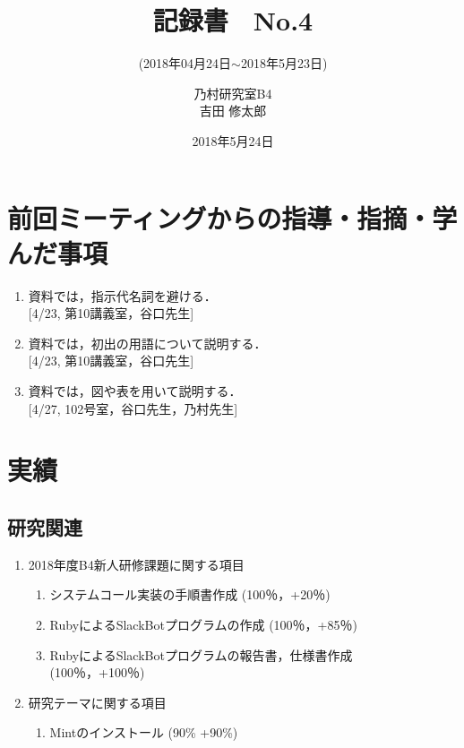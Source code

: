 \documentclass[fleqn, 14pt]{extarticle}
\subtitle{(2018年04月24日$\sim$2018年5月23日)}
\author{乃村研究室B4\\吉田 修太郎}
\date{2018年5月24日}
\title{記録書　No.4}
\begin{document}
\maketitle
\section{前回ミーティングからの指導・指摘・学んだ事項}
\label{sec1}
\begin{enumerate}
\item 資料では，指示代名詞を避ける．\\
  \hfill[4/23, 第10講義室，谷口先生]
\item 資料では，初出の用語について説明する．\\
  \hfill[4/23, 第10講義室，谷口先生]
\item 資料では，図や表を用いて説明する．\\
  \hfill[4/27, 102号室，谷口先生，乃村先生]
\end{enumerate}

\section{実績}
\label{sec2}
\subsection{研究関連}
\label{sec2-1}
\begin{enumerate}
\item 2018年度B4新人研修課題に関する項目
  \hfill
  \label{sec2-1-1}
  \begin{enumerate}
  \item システムコール実装の手順書作成
    \hfill
    \label{sec2-1-1-enum1}
    (100％，+20％)
  \item RubyによるSlackBotプログラムの作成
    \hfill
    \label{sec2-1-1-enum2}
    (100％，+85％)
  \item RubyによるSlackBotプログラムの報告書，仕様書作成 \\
    \hfill
    \label{sec2-1-1-enum3}
    (100％，+100％)
  \end{enumerate}
\item 研究テーマに関する項目
  \label{sec2-1-2}
  \begin{enumerate}
  \item Mintのインストール
    \label{sec2-1-2-enum1}
    \hfill
    (90\% +90\%)
  \end{enumerate}
\end{enumerate}
\end{document}
